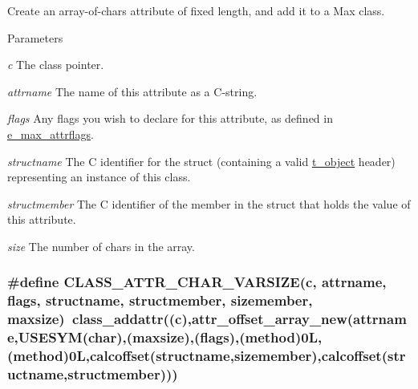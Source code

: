 Create an array-\/of-\/chars attribute of fixed length, and add it to a Max class. 
\begin{DoxyParams}{Parameters}
\item[{\em c}]The class pointer. \item[{\em attrname}]The name of this attribute as a C-\/string. \item[{\em flags}]Any flags you wish to declare for this attribute, as defined in \hyperlink{group__attr_gaf296cfc6741bb19207f6ed8062809115}{e\_\-max\_\-attrflags}. \item[{\em structname}]The C identifier for the struct (containing a valid \hyperlink{structt__object}{t\_\-object} header) representing an instance of this class. \item[{\em structmember}]The C identifier of the member in the struct that holds the value of this attribute. \item[{\em size}]The number of chars in the array. \end{DoxyParams}
\hypertarget{group__attr_ga9729e0c9d3bab5d0f1160b3c2e5f2eab}{
\subsubsection[{CLASS\_\-ATTR\_\-CHAR\_\-VARSIZE}]{\setlength{\rightskip}{0pt plus 5cm}\#define CLASS\_\-ATTR\_\-CHAR\_\-VARSIZE(c, \/  attrname, \/  flags, \/  structname, \/  structmember, \/  sizemember, \/  maxsize)~class\_\-addattr((c),attr\_\-offset\_\-array\_\-new(attrname,USESYM(char),(maxsize),(flags),({\bf method})0L,(method)0L,calcoffset(structname,sizemember),calcoffset(structname,structmember)))}}
\label{group__attr_ga9729e0c9d3bab5d0f1160b3c2e5f2eab}


